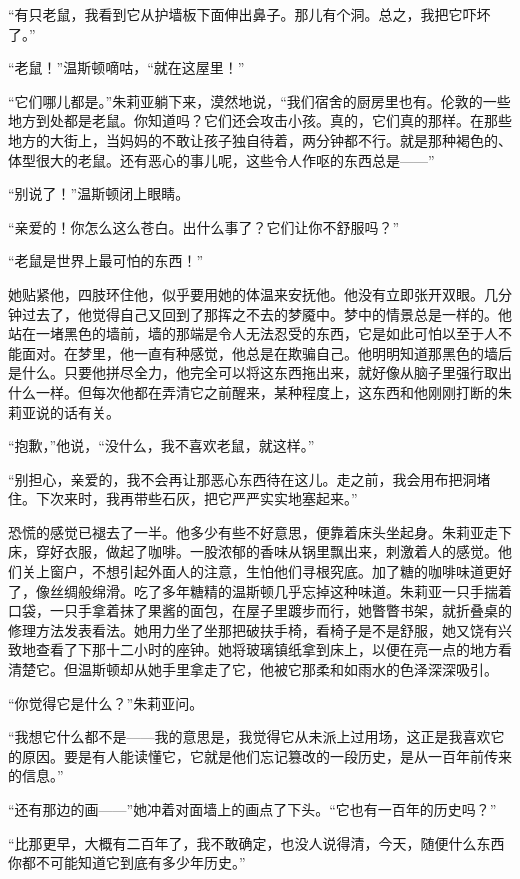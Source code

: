 ``有只老鼠，我看到它从护墙板下面伸出鼻子。那儿有个洞。总之，我把它吓坏了。''

``老鼠！''温斯顿嘀咕，``就在这屋里！''

``它们哪儿都是。''朱莉亚躺下来，漠然地说，``我们宿舍的厨房里也有。伦敦的一些地方到处都是老鼠。你知道吗？它们还会攻击小孩。真的，它们真的那样。在那些地方的大街上，当妈妈的不敢让孩子独自待着，两分钟都不行。就是那种褐色的、体型很大的老鼠。还有恶心的事儿呢，这些令人作呕的东西总是------''

``别说了！''温斯顿闭上眼睛。

``亲爱的！你怎么这么苍白。出什么事了？它们让你不舒服吗？''

``老鼠是世界上最可怕的东西！''

她贴紧他，四肢环住他，似乎要用她的体温来安抚他。他没有立即张开双眼。几分钟过去了，他觉得自己又回到了那挥之不去的梦魇中。梦中的情景总是一样的。他站在一堵黑色的墙前，墙的那端是令人无法忍受的东西，它是如此可怕以至于人不能面对。在梦里，他一直有种感觉，他总是在欺骗自己。他明明知道那黑色的墙后是什么。只要他拼尽全力，他完全可以将这东西拖出来，就好像从脑子里强行取出什么一样。但每次他都在弄清它之前醒来，某种程度上，这东西和他刚刚打断的朱莉亚说的话有关。

``抱歉，''他说，``没什么，我不喜欢老鼠，就这样。''

``别担心，亲爱的，我不会再让那恶心东西待在这儿。走之前，我会用布把洞堵住。下次来时，我再带些石灰，把它严严实实地塞起来。''

恐慌的感觉已褪去了一半。他多少有些不好意思，便靠着床头坐起身。朱莉亚走下床，穿好衣服，做起了咖啡。一股浓郁的香味从锅里飘出来，刺激着人的感觉。他们关上窗户，不想引起外面人的注意，生怕他们寻根究底。加了糖的咖啡味道更好了，像丝绸般绵滑。吃了多年糖精的温斯顿几乎忘掉这种味道。朱莉亚一只手揣着口袋，一只手拿着抹了果酱的面包，在屋子里踱步而行，她瞥瞥书架，就折叠桌的修理方法发表看法。她用力坐了坐那把破扶手椅，看椅子是不是舒服，她又饶有兴致地查看了下那十二小时的座钟。她将玻璃镇纸拿到床上，以便在亮一点的地方看清楚它。但温斯顿却从她手里拿走了它，他被它那柔和如雨水的色泽深深吸引。

``你觉得它是什么？''朱莉亚问。

``我想它什么都不是------我的意思是，我觉得它从未派上过用场，这正是我喜欢它的原因。要是有人能读懂它，它就是他们忘记篡改的一段历史，是从一百年前传来的信息。''

``还有那边的画------''她冲着对面墙上的画点了下头。``它也有一百年的历史吗？''

``比那更早，大概有二百年了，我不敢确定，也没人说得清，今天，随便什么东西你都不可能知道它到底有多少年历史。''

